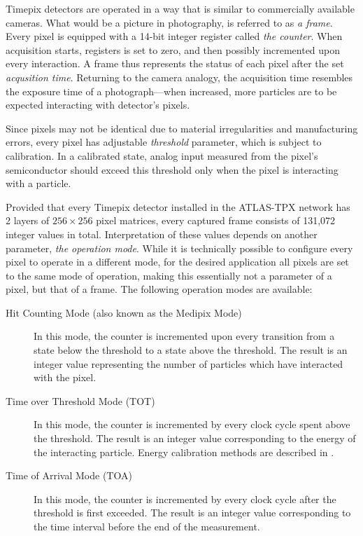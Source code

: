 Timepix detectors are operated in a way that is similar to commercially available cameras. What would be a picture in photography, is referred to as \textit{a frame}. Every pixel is equipped with a 14-bit integer register called \textit{the counter}. When acquisition starts, registers is set to zero, and then possibly incremented upon every interaction. A frame thus represents the status of each pixel after the set \textit{acqusition time}. Returning to the camera analogy, the acquisition time resembles the exposure time of a photograph---when increased, more particles are to be expected interacting with detector's pixels.

Since pixels may not be identical due to material irregularities and manufacturing errors, every pixel has adjustable \textit{threshold} parameter, which is subject to calibration. In a calibrated state, analog input measured from the pixel's semiconductor should exceed this threshold only when the pixel is interacting with a particle.

Provided that every Timepix detector installed in the ATLAS-TPX network has 2 layers of $256 \times 256$ pixel matrices, every captured frame consists of 131,072 integer values in total. Interpretation of these values depends on another parameter, \textit{the operation mode}. While it is technically possible to configure every pixel to operate in a different mode, for the desired application all pixels are set to the same mode of operation, making this essentially not a parameter of a pixel, but that of a frame. The following operation modes are available:

\begin{description}
	\item[Hit Counting Mode (also known as the Medipix Mode)]
	In this mode, the counter is incremented upon every transition from a state below the threshold to a state above the threshold. The result is an integer value representing the number of particles which have interacted with the pixel.

	\item[Time over Threshold Mode (TOT)]\label{tpx:tot}
	In this mode, the counter is incremented by every clock cycle spent above the threshold. The result is an integer value corresponding to the energy of the interacting particle. Energy calibration methods are described in \cite{Jakubek2011S262}.

	\item[Time of Arrival Mode (TOA)]\label{tpx:toa}
	In this mode, the counter is incremented by every clock cycle after the threshold is first exceeded. The result is an integer value corresponding to the time interval before the end of the measurement.
\end{description}

